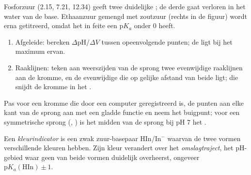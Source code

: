 Fosforzuur (2.15, 7.21, 12.34) geeft twee duidelijke ; de
derde gaat verloren in het water van de base. Ethaanzuur gemengd met
zoutzuur (rechts in de figuur) wordt erna getitreerd, omdat het  in feite een $\mathrm{p}K_a$ onder 0 heeft.

\begin{method}\label{met:b1:titration-methods:derivative}
\begin{enumerate}
  \item Afgeleide: bereken $\Delta\mathrm{pH}/\Delta V$ tussen
        opeenvolgende punten; de  ligt bij het maximum ervan.
  \item Raaklijnen: teken aan weerszijden van de sprong twee evenwijdige
        raaklijnen aan de kromme, en de evenwijdige die op gelijke afstand
        van beide ligt; die snijdt de kromme in het .
\end{enumerate}
\end{method}

\begin{method}\label{met:b1:titration-methods:tangents}
Pas voor een kromme die door een computer geregistreerd is, de punten aan
elke kant van de sprong aan met een gladde functie en neem het
buigpunt; voor een symmetrische sprong (, ) is het
midden van de sprong bij pH 7 het .
\end{method}

\begin{definition}\label{def:b1:titration-methods:indicator}
Een \emph{kleurindicator} is een zwak
zuur-basepaar HIn/In$^-$ waarvan de twee vormen verschillende kleuren
hebben. Zijn kleur verandert over het
\emph{omslagtraject}, het pH-gebied waar geen van
beide vormen duidelijk overheerst, ongeveer
$\mathrm{p}K_{a}(\mathrm{HIn}) \pm 1$.
\end{definition}

